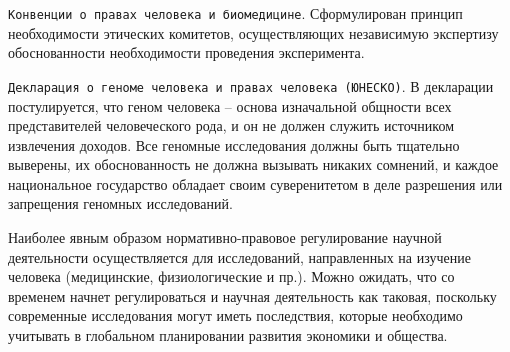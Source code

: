 \texttt{Конвенции о правах человека и биомедицине}. Сформулирован принцип необходимости этических комитетов, осуществляющих независимую экспертизу обоснованности необходимости проведения эксперимента.

\texttt{Декларация о геноме человека и правах человека (ЮНЕСКО)}. В декларации постулируется, что геном человека – основа изначальной общности всех представителей человеческого рода, и он не должен служить источником извлечения доходов. Все геномные исследования должны быть тщательно выверены, их обоснованность не должна вызывать никаких сомнений, и каждое национальное государство обладает своим суверенитетом в деле разрешения или запрещения геномных исследований. 

Наиболее явным образом нормативно-правовое регулирование научной деятельности осуществляется для исследований, направленных на изучение человека (медицинские, физиологические и пр.). Можно ожидать, что со временем начнет регулироваться и научная деятельность как таковая, поскольку современные исследования могут иметь последствия, которые необходимо учитывать в глобальном планировании развития экономики и общества.